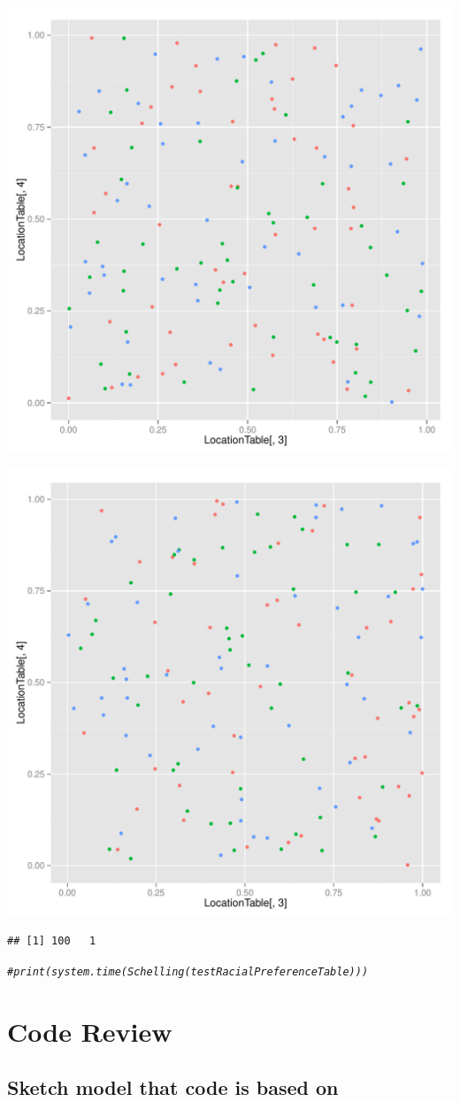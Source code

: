 \documentclass{article}\usepackage[]{graphicx}\usepackage[]{color}
\makeatletter
\def\maxwidth{ %
  \ifdim\Gin@nat@width>\linewidth
    \linewidth
  \else
    \Gin@nat@width
  \fi
}
\newcommand{\hlcom}[1]{\textcolor[rgb]{0.678,0.584,0.686}{\textit{#1}}}%
\newenvironment{kframe}{%
 \def\at@end@of@kframe{}%
 \ifinner\ifhmode%
  \def\at@end@of@kframe{\end{minipage}}%
  \begin{minipage}{\columnwidth}%
 \fi\fi%
 \def\FrameCommand##1{\hskip\@totalleftmargin \hskip-\fboxsep
 \colorbox{shadecolor}{##1}\hskip-\fboxsep
     \hskip-\linewidth \hskip-\@totalleftmargin \hskip\columnwidth}%
 \MakeFramed {\advance\hsize-\width
   \@totalleftmargin\z@ \linewidth\hsize
   \@setminipage}}%
 {\par\unskip\endMakeFramed%
 \at@end@of@kframe}
\newenvironment{knitrout}{}{} %
\makeatother
\begin{document}
\begin{knitrout}
\includegraphics[width=\maxwidth]{figure/unnamed-chunk-2-20} 

\includegraphics[width=\maxwidth]{figure/unnamed-chunk-2-21} 
\begin{kframe}\begin{verbatim}
## [1] 100   1
\end{verbatim}
\begin{alltt}
\hlcom{# print(system.time(Schelling(testRacialPreferenceTable)))}
\end{alltt}
\end{kframe}
\end{knitrout}

\section{Code Review}
\subsection{Sketch model that code is based  on}
\end{document}
